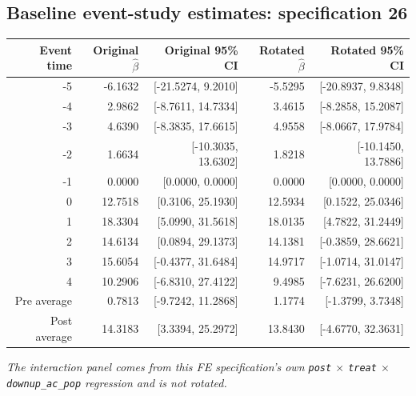 \documentclass[10pt]{article}
\begin{document}
\subsection*{Baseline event-study estimates: specification 26}
\begin{center}
\scriptsize
\begin{tabular}{r rr rr}
\toprule
Event time & Original $\hat\beta$ & Original 95\% CI & Rotated $\hat\beta$ & Rotated 95\% CI \\
\midrule
-5 & -6.1632 & [-21.5274, 9.2010] & -5.5295 & [-20.8937, 9.8348] \\
-4 & 2.9862 & [-8.7611, 14.7334] & 3.4615 & [-8.2858, 15.2087] \\
-3 & 4.6390 & [-8.3835, 17.6615] & 4.9558 & [-8.0667, 17.9784] \\
-2 & 1.6634 & [-10.3035, 13.6302] & 1.8218 & [-10.1450, 13.7886] \\
-1 & 0.0000 & [0.0000, 0.0000] & 0.0000 & [0.0000, 0.0000] \\
0 & 12.7518 & [0.3106, 25.1930] & 12.5934 & [0.1522, 25.0346] \\
1 & 18.3304 & [5.0990, 31.5618] & 18.0135 & [4.7822, 31.2449] \\
2 & 14.6134 & [0.0894, 29.1373] & 14.1381 & [-0.3859, 28.6621] \\
3 & 15.6054 & [-0.4377, 31.6484] & 14.9717 & [-1.0714, 31.0147] \\
4 & 10.2906 & [-6.8310, 27.4122] & 9.4985 & [-7.6231, 26.6200] \\
\midrule
Pre average & 0.7813 & [-9.7242, 11.2868] & 1.1774 & [-1.3799, 3.7348] \\
Post average & 14.3183 & [3.3394, 25.2972] & 13.8430 & [-4.6770, 32.3631] \\
\bottomrule
\end{tabular}
\end{center}
\medskip
\textit{The interaction panel comes from this FE specification's own \texttt{post} $\times$ \texttt{treat} $\times$ \texttt{downup\_ac\_pop} regression and is not rotated.}
\clearpage
\end{document}
